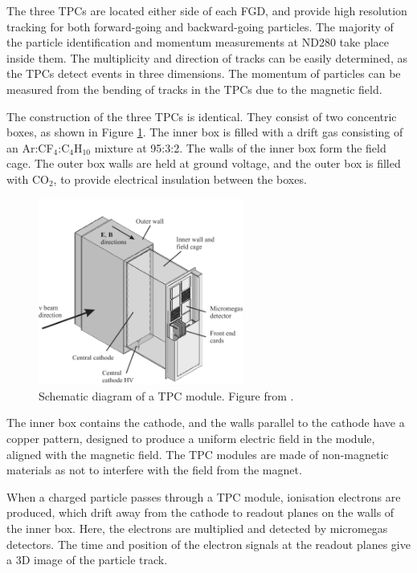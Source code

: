 The three TPCs are located either side of each FGD, and provide high resolution tracking for both forward-going and backward-going particles. The majority of the particle identification and momentum measurements at ND280 take place inside them. The multiplicity and direction of tracks can be easily determined, as the TPCs detect events in three dimensions. The momentum of particles can be measured from the bending of tracks in the TPCs due to the magnetic field.

The construction of the three TPCs is identical. They consist of two concentric boxes, as shown in Figure \ref{fig:tpcconstruction}. The inner box is filled with a drift gas consisting of an Ar:CF$_4$:C$_4$H$_{10}$ mixture at 95:3:2. The walls of the inner box form the field cage. The outer box walls are held at ground voltage, and the outer box is filled with CO$_2$, to provide electrical insulation between the boxes. 

\begin{figure}[!htbp]
\centering
\includegraphics*[width=0.6\textwidth,clip]{figs/tpc}
\caption{Schematic diagram of a TPC module. Figure from \cite{tript}.} \label{fig:tpcconstruction}
\end{figure}

The inner box contains the cathode, and the walls parallel to the cathode have a copper pattern, designed to produce a uniform electric field in the module, aligned with the magnetic field. The TPC modules are made of non-magnetic materials as not to interfere with the field from the magnet. 

When a charged particle passes through a TPC module, ionisation electrons are produced, which drift away from the cathode to readout planes on the walls of the inner box. Here, the electrons are multiplied and detected by micromegas detectors. The time and position of the electron signals at the readout planes give a 3D image of the particle track.

